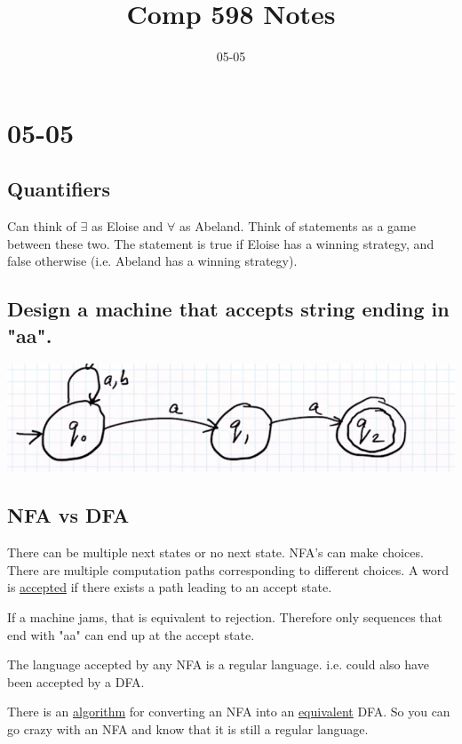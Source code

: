 \documentclass[class=scrartcl, crop=false]{standalone}
\title{Comp 598 Notes}
\date{05-05}
\begin{document}
\section{05-05}

\subsection{Quantifiers}

Can think of $\exists$ as Eloise and $\forall$ as Abeland. Think of statements
as a game between these two. The statement is true if Eloise has a winning
strategy, and false otherwise (i.e. Abeland has a winning strategy).

\subsection{Design a machine that accepts string ending in "aa".}

\includegraphics[width=\textwidth]{nondeterministic_finite_automaton}
\subsection{NFA vs DFA}
\begin{enumerate}
  \ii There can be multiple next states or no next state. NFA's can make
  choices. There are multiple computation paths corresponding to different
  choices. A word is \ul{accepted} if there exists a path leading to an accept
  state.

\end{enumerate} 
If a machine jams, that is equivalent to rejection. Therefore only sequences
that end with "aa" can end up at the accept state.

\begin{theorem}
  The language accepted by any NFA is a regular language. i.e. could also have
  been accepted by a DFA.
\end{theorem}
\begin{remark}
  There is an \ul{algorithm} for converting an NFA into an \ul{equivalent} DFA.
  So you can go crazy with an NFA and know that it is still a regular language.
\end{remark}
\end{document}
